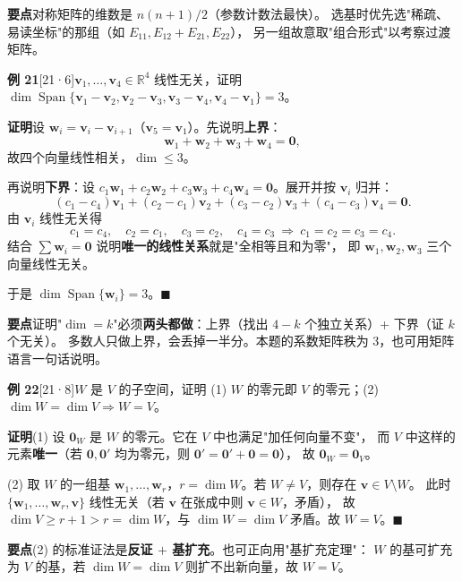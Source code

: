 \documentclass[10pt]{ctexart}
\newcommand{\Rr}{\mathbb{R}}
\newcommand{\Span}{\operatorname{Span}}
\newcommand{\y}[1]{\textcolor{y21}{[21·#1]}}
\begin{document}
\begin{tipbox}
\textbf{要点}\quad 对称矩阵的维数是 $n(n+1)/2$（参数计数法最快）。
选基时优先选"稀疏、易读坐标"的那组（如 $E_{11},E_{12}+E_{21},E_{22}$），
另一组故意取"组合形式"以考察过渡矩阵。
\end{tipbox}

\medskip
\textbf{例 21}\y{6}\quad $\mathbf v_1,\dots,\mathbf v_4\in\Rr^4$ 线性无关，证明
$\dim\Span\{\mathbf v_1-\mathbf v_2,\mathbf v_2-\mathbf v_3,\mathbf v_3-\mathbf v_4,\mathbf v_4-\mathbf v_1\}=3$。

\textbf{证明}\quad 设 $\mathbf w_i=\mathbf v_i-\mathbf v_{i+1}$（$\mathbf v_5=\mathbf v_1$）。先说明\textbf{上界}：
\[
\mathbf w_1+\mathbf w_2+\mathbf w_3+\mathbf w_4=\mathbf 0 ,
\]
故四个向量线性相关，$\dim\le3$。

再说明\textbf{下界}：设 $c_1\mathbf w_1+c_2\mathbf w_2+c_3\mathbf w_3+c_4\mathbf w_4=\mathbf 0$。展开并按 $\mathbf v_i$ 归并：
\[
(c_1-c_4)\mathbf v_1+(c_2-c_1)\mathbf v_2+(c_3-c_2)\mathbf v_3+(c_4-c_3)\mathbf v_4=\mathbf 0 .
\]
由 $\mathbf v_i$ 线性无关得
\[
c_1=c_4,\quad c_2=c_1,\quad c_3=c_2,\quad c_4=c_3\ \Longrightarrow\ c_1=c_2=c_3=c_4 .
\]
结合 $\sum\mathbf w_i=\mathbf 0$ 说明\textbf{唯一的线性关系}就是"全相等且和为零"，
即 $\mathbf w_1,\mathbf w_2,\mathbf w_3$ 三个向量线性无关。

于是 $\dim\Span\{\mathbf w_i\}=3$。$\blacksquare$

\begin{tipbox}
\textbf{要点}\quad 证明"$\dim=k$"必须\textbf{两头都做}：上界（找出 $4-k$ 个独立关系）+ 下界（证 $k$ 个无关）。
多数人只做上界，会丢掉一半分。本题的系数矩阵秩为 3，也可用矩阵语言一句话说明。
\end{tipbox}

\medskip
\textbf{例 22}\y{8}\quad $W$ 是 $V$ 的子空间，证明 (1) $W$ 的零元即 $V$ 的零元；(2) $\dim W=\dim V\Rightarrow W=V$。

\textbf{证明}\quad (1) 设 $\mathbf 0_W$ 是 $W$ 的零元。它在 $V$ 中也满足"加任何向量不变"，
而 $V$ 中这样的元素\textbf{唯一}（若 $\mathbf 0,\mathbf 0'$ 均为零元，则 $\mathbf 0'=\mathbf 0'+\mathbf 0=\mathbf 0$），
故 $\mathbf 0_W=\mathbf 0_V$。

(2) 取 $W$ 的一组基 $\mathbf w_1,\dots,\mathbf w_r$，$r=\dim W$。若 $W\ne V$，则存在 $\mathbf v\in V\setminus W$。
此时 $\{\mathbf w_1,\dots,\mathbf w_r,\mathbf v\}$ 线性无关（若 $\mathbf v$ 在张成中则 $\mathbf v\in W$，矛盾），
故 $\dim V\ge r+1>r=\dim W$，与 $\dim W=\dim V$ 矛盾。故 $W=V$。$\blacksquare$

\begin{tipbox}
\textbf{要点}\quad (2) 的标准证法是\textbf{反证 $+$ 基扩充}。也可正向用"基扩充定理"：
$W$ 的基可扩充为 $V$ 的基，若 $\dim W=\dim V$ 则扩不出新向量，故 $W=V$。
\end{tipbox}
\end{document}
